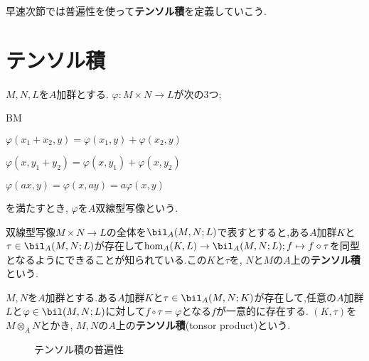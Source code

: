 早速次節では普遍性を使って\textbf{テンソル積}を定義していこう.

\section{テンソル積}

\begin{defi}[双線型写像]
	$M,N,L$を$A$加群とする. $\varphi:M\times N\to L$が次の3つ;
	\begin{defiterm}{BM}
		\item $\varphi(x_1+x_2,y)=\varphi(x_1,y)+\varphi(x_2,y)$
		\item $\varphi(x,y_1+y_2)=\varphi(x,y_1)+\varphi(x,y_2)$
		\item $\varphi(ax,y)=\varphi(x,ay)=a\varphi(x,y)$
	\end{defiterm}
	を満たすとき, $\varphi$を$A$双線型写像という.
\end{defi}

双線型写像$M\times N\to L$の全体を$\bil_A(M,N;L)$で表すとすると,ある$A$加群$K$と$\tau\in\bil_A(M,N;L)$が存在して$\hom_A(K,L)\to\bil_A(M,N;L);f\mapsto f\circ\tau$を同型となるようにできることが知られている.この$K$と$\tau$を, $N$と$M$の$A$上の\textbf{テンソル積}という.

\begin{defi}[テンソル積]
	$M,N$を$A$加群とする.ある$A$加群$K$と$\tau\in\bil_A(M,N;K)$が存在して,任意の$A$加群$L$と$\varphi\in\bil(M,N;L)$に対して$f\circ\tau=\varphi$となる$f$が一意的に存在する. $(K,\tau)$を$M\otimes_A N$とかき, $M,N$の$A$上の\textbf{テンソル積}(tonsor product)という.
\end{defi}

\begin{figure}[H]
	\centering
	\caption{テンソル積の普遍性}\label{fig:tensor}
\end{figure}

